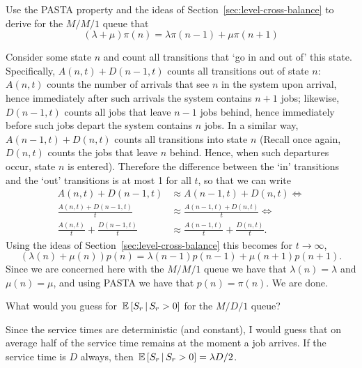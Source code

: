 \begin{question}
  Use the PASTA property and the ideas of Section~\ref{sec:level-cross-balance}
 to derive  for the $M/M/1$ queue that
  \begin{equation*}
  (\lambda + \mu) \pi(n) = \lambda \pi(n-1) + \mu \pi(n+1)
  \end{equation*}
  \begin{solution}
    Consider some state $n$ and count all transitions that `go in and
    out of' this state. Specifically, $A(n,t) + D(n-1,t)$ counts all
    transitions out of state $n$: $A(n,t)$ counts the number of
    arrivals that see $n$ in the system upon arrival, hence
    immediately after such arrivals the system contains $n+1$ jobs;
    likewise, $D(n-1,t)$ counts all jobs that leave $n-1$ jobs behind,
    hence immediately before such jobs depart the system contains $n$
    jobs.  In a similar way, $A(n-1,t) + D(n,t)$ counts all
    transitions into state $n$ (Recall once again, $D(n,t)$ counts the
    jobs that leave $n$ behind. Hence, when such departures occur,
    state $n$ is entered).  Therefore the difference between the `in'
    transitions and the `out' transitions is at most 1 for all $t$, so
    that we can write
    \begin{equation*}
      \begin{split}
      A(n,t) + D(n-1,t) &\approx A(n-1,t) + D(n,t)  \iff \\
      \frac{A(n,t) + D(n-1,t)}t &\approx \frac{A(n-1,t) + D(n, t)}t \iff \\
      \frac{A(n,t)}t + \frac{D(n-1,t)}t &\approx \frac{A(n-1,t)}t + \frac{D(n,t)}t.
      \end{split}
    \end{equation*}
Using the ideas of Section~\ref{sec:level-cross-balance} this becomes for $t\to\infty$, 
\begin{equation*}
  (\lambda(n) +\mu(n))p(n) = \lambda(n-1)p(n-1) + \mu(n+1)p(n+1).
\end{equation*}
Since we are concerned here with the $M/M/1$ queue we have that
$ \lambda(n) = \lambda$ and $\mu(n) = \mu$, and using PASTA we have
that $p(n) = \pi(n)$. We are done.
  \end{solution}
\end{question}


\begin{question}
  What would you guess for $\,\mathbb{E}\left[S_r\,\middle|\, S_r>0\right]$ for the $M/D/1$ queue? 
  \begin{solution}
    Since the service times are deterministic (and constant), I would
    guess that on average half of the service time remains at the
    moment a job arrives. If the service time is $D$ always, then
    $\,\mathbb{E}\left[S_r\,\middle|\, S_r>0\right] = \lambda D/2$.  
  \end{solution}
\end{question}


